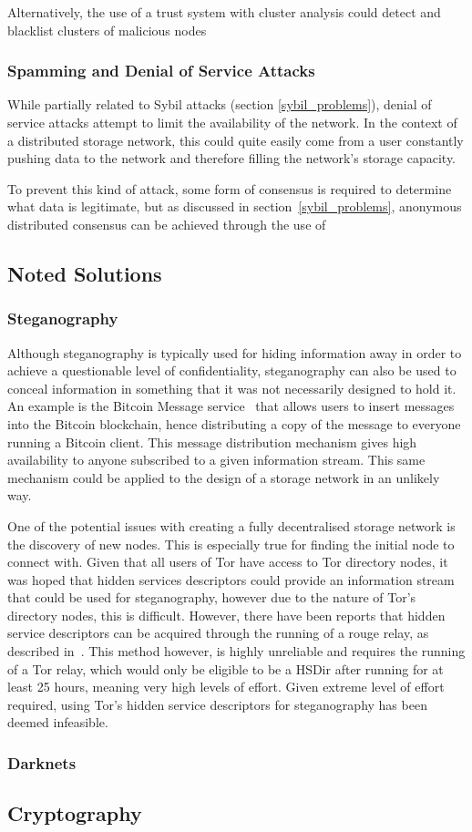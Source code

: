 			Alternatively, the use of a trust system with cluster analysis could detect and blacklist clusters of malicious nodes
		\subsubsection*{Spamming and Denial of Service Attacks}
			While partially related to Sybil attacks (section \ref{sybil_problems}), denial of service attacks attempt to limit the availability of the network. In the context of a distributed storage network, this could quite easily come from a user constantly pushing data to the network and therefore filling the network's storage capacity.
			
			To prevent this kind of attack, some form of consensus is required to determine what data is legitimate, but as discussed in section~\ref{sybil_problems}, anonymous distributed consensus can be achieved through the use of 
	\subsection{Noted Solutions}
		\subsubsection*{Steganography}
				Although steganography is typically used for hiding information away in order to achieve a questionable level of confidentiality, steganography can also be used to conceal information in something that it was not necessarily designed to hold it. An example is the Bitcoin Message service~\cite{bitmsg} that allows users to insert messages into the Bitcoin blockchain, hence distributing a copy of the message to everyone running a Bitcoin client. This message distribution mechanism gives high availability to anyone subscribed to a given information stream. This same mechanism could be applied to the design of a storage network in an unlikely way.
				
				One of the potential issues with creating a fully decentralised storage network is the discovery of new nodes. This is especially true for finding the initial node to connect with. Given that all users of Tor have access to Tor directory nodes, it was hoped that hidden services descriptors could provide an information stream that could be used for steganography, however due to the nature of Tor's directory nodes, this is difficult. However, there have been reports that hidden service descriptors can be acquired through the running of a rouge relay, as described in~\cite{crawl}. This method however, is highly unreliable and requires the running of a Tor relay, which would only be eligible to be a HSDir after running for at least 25 hours, meaning very high levels of effort. Given extreme level of effort required, using Tor's hidden service descriptors for steganography has been deemed infeasible.
		\subsubsection*{Darknets}
	\subsection{Cryptography}
